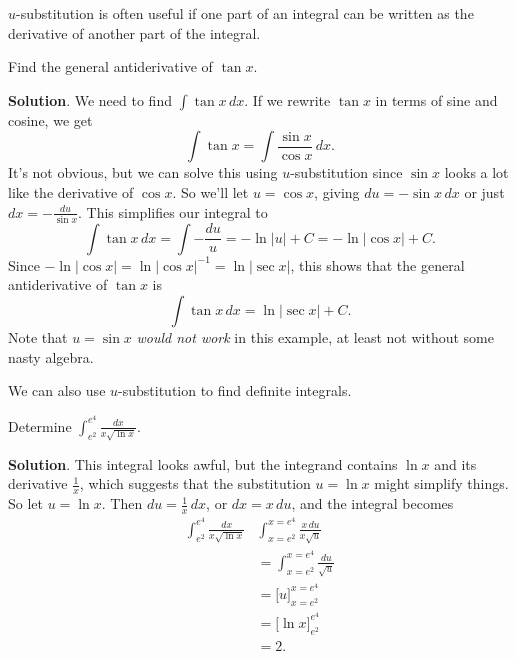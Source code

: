 \documentclass[10pt,]{book}
\theoremstyle{ptxplainnotitle}
\theoremstyle{ptxplaintitle}
\theoremstyle{ptxplainnotitle}
\theoremstyle{ptxplaintitle}
\theoremstyle{ptxplainnotitle}
\theoremstyle{ptxplaintitle}
\theoremstyle{ptxdefinitionnotitle}
\theoremstyle{ptxdefinitiontitle}
\theoremstyle{ptxdefinitionnotitle}
\theoremstyle{ptxdefinitiontitle}
\theoremstyle{ptxdefinitionnotitle}
\theoremstyle{ptxdefinitiontitle}
\theoremstyle{ptxdefinitionnotitle}
\theoremstyle{ptxdefinitiontitle}
\theoremstyle{ptxdefinitionnotitle}
\theoremstyle{ptxdefinitiontitle}
\numberwithin{equation}{section}
\begin{document}
\hypertarget{p-485}{}%
\(u\)-substitution is often useful if one part of an integral can be written as the derivative of another part of the integral.%
\begin{example}\label{example-integral-of-tangent}
\hypertarget{p-486}{}%
Find the general antiderivative of \(\tan x\).%
\par\smallskip%
\noindent\textbf{Solution}.\hypertarget{solution-107}{}\quad%
\hypertarget{p-487}{}%
We need to find \(\int\tan x\,dx\). If we rewrite \(\tan x\) in terms of sine and cosine, we get%
\begin{equation*}
\int\tan x = \int\frac{\sin x}{\cos x}\,dx.
\end{equation*}
It's not obvious, but we can solve this using \(u\)-substitution since \(\sin x\) looks a lot like the derivative of \(\cos x\). So we'll let \(u = \cos x\), giving \(du = -\sin x\,dx\) or just \(dx = -\frac{du}{\sin x}\). This simplifies our integral to%
\begin{equation*}
\int\tan x\,dx = \int-\frac{du}{u} = -\ln|u| + C = -\ln|\cos x|+C.
\end{equation*}
Since \(-\ln|\cos x| = \ln|\cos x|^{-1} = \ln|\sec x|\), this shows that the general antiderivative of \(\tan x\) is%
\begin{equation*}
\int \tan x\,dx = \ln|\sec x| + C.
\end{equation*}
Note that \(u = \sin x\) \emph{would not work} in this example, at least not without some nasty algebra.%
\end{example}
\hypertarget{p-488}{}%
We can also use \(u\)-substitution to find definite integrals.%
\begin{example}\label{example-integrating-with-a-natural-log}
\hypertarget{p-489}{}%
Determine \(\int_{e^{2}}^{e^{4}}\frac{dx}{x\sqrt{\ln x}}\).%
\par\smallskip%
\noindent\textbf{Solution}.\hypertarget{solution-108}{}\quad%
\hypertarget{p-490}{}%
This integral looks awful, but the integrand contains \(\ln x\) and its derivative \(\frac{1}{x}\), which suggests that the substitution \(u = \ln x\) might simplify things. So let \(u = \ln x\). Then \(du = \frac{1}{x}\,dx\), or \(dx = x\,du\), and the integral becomes%
\begin{align*}
\int_{e^{2}}^{e^{4}}\frac{dx}{x\sqrt{\ln x}} & \int_{x=e^{2}}^{x=e^{4}}\frac{x\,du}{x\sqrt{u}} \\
& = \int_{x=e^{2}}^{x=e^{4}}\frac{du}{\sqrt{u}} \\
& = \Big[u\Big]_{x=e^{2}}^{x=e^{4}} \\
& = \Big[\ln x\Big]_{e^{2}}^{e^{4}} \\
& = 2. 
\end{align*}
%
\end{example}
\end{document}

